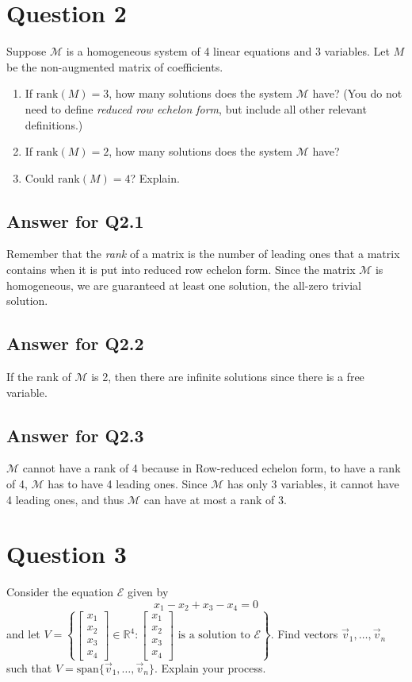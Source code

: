 \documentclass[letter]{article}
\newcommand{\R}{\mathbb{R}}
\newcommand{\Span}{\mathrm{span}}
\newcommand{\Rank}{\mathrm{rank}}
\newcommand{\mat}[1]{\begin{bmatrix}#1\end{bmatrix}}
\begin{document}
\section{Question 2}
Suppose $\mathcal M$ is a homogeneous system of 4 linear equations and 3 variables.
      Let $M$ be the non-augmented matrix of coefficients.
      \begin{enumerate}
        \item If $\Rank(M)=3$, how many solutions does the system $\mathcal M$ have?
          (You do not need to define \emph{reduced row echelon form}, but include
          all other relevant definitions.)
        \item If $\Rank(M)=2$, how many solutions does the system $\mathcal M$ have?
        \item Could $\Rank(M)=4$? Explain.
      \end{enumerate}
\subsection{Answer for Q2.1}
Remember that the \emph{rank} of a matrix is the number of leading ones that a matrix contains when it is put into reduced row echelon form. Since the matrix $\mathcal M$ is homogeneous, we are guaranteed at least one solution, the all-zero trivial solution.


\subsection{Answer for Q2.2}
If the rank of $\mathcal M$ is 2, then there are infinite solutions since there is a free variable.

\subsection{Answer for Q2.3}
$\mathcal M$ cannot have a rank of 4 because in Row-reduced echelon form, to have a rank of 4, $\mathcal M$ has to have 4 leading ones. Since $\mathcal M$ has only 3 variables, it cannot have 4 leading ones, and thus $\mathcal M$ can have at most a rank of 3.

\section{Question 3}
Consider the equation $\mathcal E$ given by
      \[
        x_1-x_2+x_3-x_4=0
      \]
      and let $V=\left\{\mat{x_1\\x_2\\x_3\\x_4}\in \R^4:\mat{x_1\\x_2\\x_3\\x_4}\text{ is a solution to }\mathcal E\right\}$.
      Find vectors $\vec v_1,\ldots,\vec v_n$ such that $V=\Span\{\vec v_1,\ldots,\vec v_n\}$.  Explain your
      process.
\end{document}

